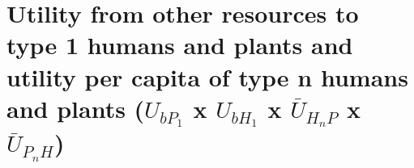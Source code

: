 \documentclass[
]{book}
\begin{document}
\hypertarget{utility-from-other-resources-to-type-1-humans-and-plants-and-utility-per-capita-of-type-n-humans-and-plants-u_bp_1-x-u_bh_1-x-baru_h_np-x-baru_p_nh}{%
\section{\texorpdfstring{Utility from other resources to type 1 humans and plants and utility per capita of type n humans and plants (\(U_{bP_{1}}\) x \(U_{bH_{1}}\) x \(\bar{U}_{H_{n}P}\) x \(\bar{U}_{P_{n}H}\))}{Utility from other resources to type 1 humans and plants and utility per capita of type n humans and plants (U\_\{bP\_\{1\}\} x U\_\{bH\_\{1\}\} x \textbackslash bar\{U\}\_\{H\_\{n\}P\} x \textbackslash bar\{U\}\_\{P\_\{n\}H\})}}\label{utility-from-other-resources-to-type-1-humans-and-plants-and-utility-per-capita-of-type-n-humans-and-plants-u_bp_1-x-u_bh_1-x-baru_h_np-x-baru_p_nh}}

\end{document}
